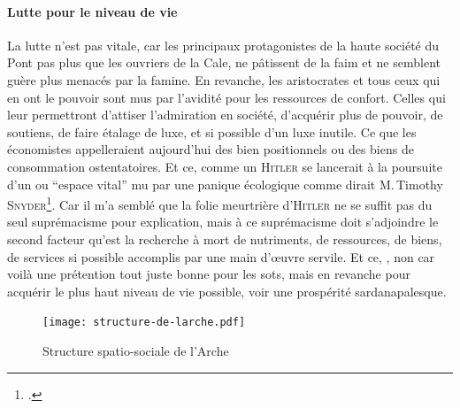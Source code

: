 \paragraph{Lutte pour le niveau de vie}
La lutte n’est pas vitale, car les principaux protagonistes de la haute société du Pont pas plus que les ouvriers de la Cale, ne pâtissent de  la faim et ne semblent guère plus menacés par la famine. En revanche, les aristocrates et tous ceux qui en ont le pouvoir sont mus par l’avidité pour les ressources de confort. Celles qui leur permettront d’attiser l’admiration en société, d’acquérir plus de pouvoir, de soutiens, de faire étalage de luxe, et si possible d’un luxe inutile. Ce que les économistes appelleraient aujourd’hui des bien positionnels ou des biens de consommation ostentatoires. Et ce, comme un \textsc{Hitler} se lancerait à la poursuite d’un  ou \enquote{espace vital} mu par une panique écologique comme dirait M.\,Timothy \textsc{Snyder}\footcite{timothySnyder2016Gallimard-TerreNoire}. Car il m’a semblé que la folie meurtrière d’\textsc{Hitler} ne se suffit pas du seul suprémacisme pour explication, mais à ce suprémacisme  doit s’adjoindre le second facteur qu’est la recherche à mort de nutriments, de ressources, de biens, de services si possible accomplis par une main d’œuvre servile. Et ce, , non car voilà une prétention tout juste bonne pour les sots, mais en revanche pour acquérir le plus haut niveau de vie possible, voir une prospérité sardanapalesque.


\begin{figure}[h]
	\centering
	\texttt{[image: structure-de-larche.pdf]}
	\caption{Structure spatio-sociale de l’Arche}
\end{figure}
